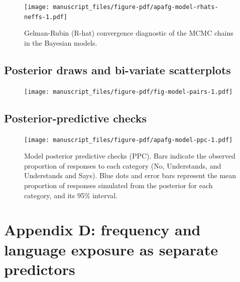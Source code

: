 \documentclass[
  man,
  floatsintext,
  colorlinks=true,linkcolor=blue,citecolor=blue,urlcolor=blue,biblatex]{apa7}
\begin{document}
\begin{figure}[h!]
\caption{Gelman-Rubin (R-hat) convergence diagnostic of the MCMC chains in the Bayesian models.}
\label{apafg-model-rhats-neffs}
\texttt{[image: manuscript\_files/figure-pdf/apafg-model-rhats-neffs-1.pdf]}

\end{figure}

\hypertarget{posterior-draws-and-bi-variate-scatterplots}{%
\subsection*{Posterior draws and bi-variate
scatterplots}\label{posterior-draws-and-bi-variate-scatterplots}}

\begin{figure}[h!]
\caption{}
\label{fig-model-pairs}
\texttt{[image: manuscript\_files/figure-pdf/fig-model-pairs-1.pdf]}

\end{figure}

\hypertarget{posterior-predictive-checks}{%
\subsection*{Posterior-predictive
checks}\label{posterior-predictive-checks}}

\begin{figure}[h!]
\caption{Model posterior predictive checks (PPC). Bars indicate the observed proportion of responses to each category (No, Understands, and Understands and Says). Blue dots and error bars represent the mean proportion of responses simulated from the posterior for each category, and its 95\% interval.}
\label{apafg-model-ppc}
\texttt{[image: manuscript\_files/figure-pdf/apafg-model-ppc-1.pdf]}

\end{figure}

\newpage{}

\hypertarget{appendix-d-frequency-and-language-exposure-as-separate-predictors}{%
\section*{Appendix D: frequency and language exposure as separate
predictors}\label{appendix-d-frequency-and-language-exposure-as-separate-predictors}}
\end{document}
